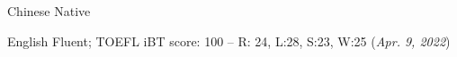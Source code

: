


\begin{cvskills}


\cvskill
{Chinese} %
{Native} %


\cvskill
{English}
{Fluent; TOEFL iBT score: 100 -- R: 24, L:28, S:23, W:25 (\textit{Apr. 9, 2022})}

\end{cvskills}